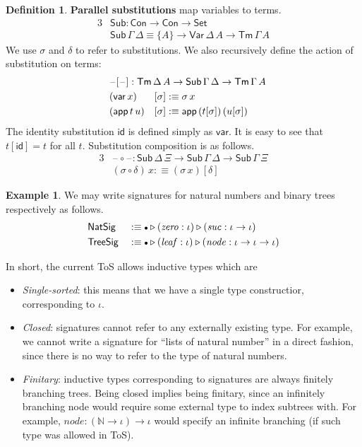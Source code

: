 \documentclass[12pt,a4paper,twoside,openany]{book}
\theoremstyle{remark}
\theoremstyle{definition}
\newtheorem{mydefinition}{Definition}
\newtheorem{myexample}{Example}
\newcommand{\mi}[1]{\mathit{#1}}
\newcommand{\ms}[1]{\mathsf{#1}}
\newcommand{\id}{\mathsf{id}}
\newcommand{\Con}{\mathsf{Con}}
\newcommand{\Sub}{\mathsf{Sub}}
\newcommand{\Tm}{\mathsf{Tm}}
\newcommand{\blank}{\mathord{\hspace{1pt}\text{--}\hspace{1pt}}}
\newcommand{\Set}{\mathsf{Set}}
\newcommand{\ext}{\triangleright}
\newcommand{\emptycon}{\scaleobj{.75}\bullet}
\newcommand{\Var}{\ms{Var}}
\newcommand{\var}{\ms{var}}
\newcommand{\app}{\ms{app}}
\newcommand{\defn}{:\equiv}
\begin{document}
\begin{mydefinition} \textbf{Parallel substitutions} map variables to terms.
\begin{alignat*}{3}
&\Sub : \Con \to \Con \to \Set\\
&\Sub\,\Gamma\,\Delta \equiv \{A\} \to \Var\,\Delta\,A \to \Tm\,\Gamma\,A
\end{alignat*}
We use $\sigma$ and $\delta$ to refer to substitutions. We also recursively
define the action of substitution on terms:
\begin{alignat*}{3}
  &\rlap{$\blank[\blank] : \Tm\,\Delta\,A \to \Sub\,\Gamma\,\Delta \to \Tm\,\Gamma\,A$}\\
  &(\var\, x)   &&[ \sigma ] \defn \sigma\,x\\
  &(\app\,t\,u) &&[ \sigma ] \defn \app\,(t[\sigma])\,(u[\sigma])
\end{alignat*}
The identity substitution $\id$ is defined simply as $\var$. It is easy to see that
$t[\id] = t$ for all $t$. Substitution composition is as follows.
\begin{alignat*}{3}
  &\blank\!\circ\!\blank : \Sub\,\Delta\,\Xi \to \Sub\,\Gamma\,\Delta \to \Sub\,\Gamma\,\Xi\\
  &(\sigma \circ \delta)\,x \defn (\sigma\,x)[\delta]
\end{alignat*}
\end{mydefinition}

\begin{myexample} We may write signatures for natural numbers and binary trees respectively as follows.
\begin{alignat*}{3}
  & \ms{NatSig}  &&\defn \emptycon \ext (\mi{zero} : \iota) \ext (\mi{suc} : \iota \to \iota)\\
  & \ms{TreeSig} &&\defn \emptycon \ext (\mi{leaf} : \iota) \ext (\mi{node} : \iota \to \iota \to \iota)
\end{alignat*}
\end{myexample}

In short, the current ToS allows inductive types which are
\begin{itemize}
\item \emph{Single-sorted}: this means that we have a single type constructior, corresponding to $\iota$.
\item \emph{Closed}: signatures cannot refer to any externally existing type. For example, we cannot write a signature for ``lists of natural number'' in a direct fashion, since there is no way to refer to the type of natural numbers.
\item \emph{Finitary}: inductive types corresponding to signatures are always
  finitely branching trees. Being closed implies being finitary, since an
  infinitely branching node would require some external type to index subtrees
  with. For example, $\mi{node} : (\mathbb{N} \to \iota) \to \iota$ would
  specify an infinite branching (if such type was allowed in ToS).
\end{itemize}
\end{document}
